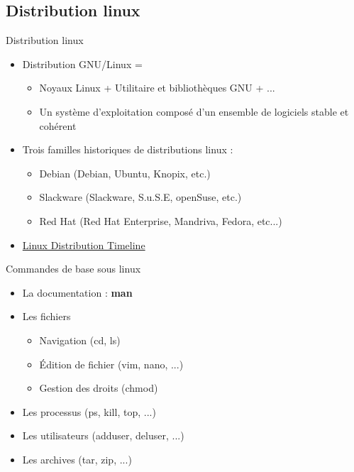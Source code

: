 \subsection{Distribution linux}
\begin{frame}{Distribution linux}

\begin{itemize}
\item Distribution GNU/Linux = 
\begin{itemize} 
        \item Noyaux Linux + Utilitaire et bibliothèques GNU + ...

        \item Un système d'exploitation composé d'un ensemble de logiciels stable et cohérent  \end{itemize}
\item Trois familles historiques de distributions linux :
  \begin{itemize}
    \item Debian (Debian, Ubuntu, Knopix, etc.)
    \item Slackware (Slackware, S.u.S.E, openSuse, etc.)
    \item Red Hat (Red Hat Enterprise, Mandriva, Fedora, etc...)
  \end{itemize}
\item \href{ldt.pdf}{Linux Distribution Timeline}
\end{itemize}

\end{frame}


\begin{frame}{Commandes de base sous linux}

\begin{itemize}
  \item La documentation : \textbf{man}
  \item Les fichiers
  \begin{itemize}
    \item Navigation (cd, ls)
    \item Édition de fichier (vim, nano, ...)
    \item Gestion des droits (chmod)
  \end{itemize}
  \item Les processus (ps, kill, top, ...)
  \item Les utilisateurs (adduser, deluser, ...)
  \item Les archives (tar, zip, ...)
\end{itemize}

\end{frame}


